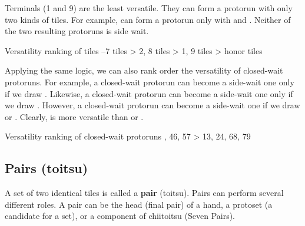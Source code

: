 \bigskip
Terminals (1 and 9) are the least versatile. They can form a protorun with only two kinds of tiles. For example, {\LARGE{}} can form a protorun only with {\LARGE{}} and {\LARGE{}}. Neither of the two resulting protoruns is side wait. 

\color{MyRed}
\begin{itembox}[c]{Versatility ranking of tiles}
\centering{}--7 tiles > 2, 8 tiles > 1, 9 tiles > honor tiles
\end{itembox}
\normalcolor
\bigskip
Applying the same logic, we can also rank order the versatility of closed-wait protoruns. 
For example, a closed-wait protorun {\LARGE{}} can become a side-wait one only if we draw {\LARGE{}}. Likewise, a closed-wait protorun {\LARGE{}} can become a side-wait one only if we draw {\LARGE{}}. However, a closed-wait protorun {\LARGE{}} can become a side-wait one if we draw {\LARGE{}} or {\LARGE{}}. Clearly, {\LARGE{}} is more versatile than {\LARGE{}} or {\LARGE{}}. 

\color{MyRed}
\begin{itembox}[c]{Versatility ranking of closed-wait protoruns}
\centering{}, 46, 57 > 13, 24, 68, 79
\end{itembox} 
\normalcolor
\bigskip

\subsection{Pairs ({\jap toitsu})}\label{sec:closevers}
 

A set of two identical tiles is called a {\bf pair} ({\jap toitsu}). 
Pairs can perform several different roles. A pair can be the head (final pair) of a hand, a protoset (a candidate for a set), or a component of {\jap chiitoitsu} (Seven Pairs). 

\bigskip
